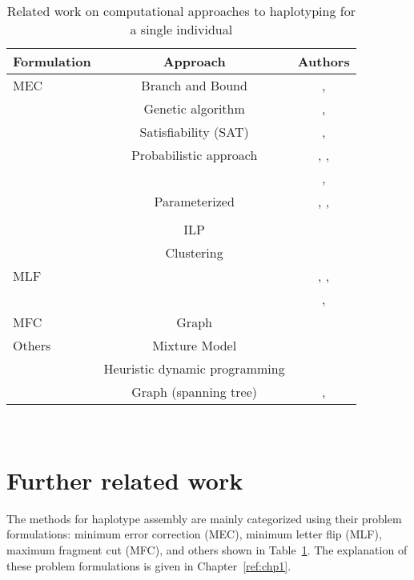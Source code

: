 \begin{center}
\begin{table}
\centering
\begin{tabular}{ |l|c|c| } 
 \hline
Formulation &  Approach  & Authors \\ 
  \hline
 MEC & Branch and Bound & \cite{wang2005haplotype}, \cite{lim2012individual}\\
   & Genetic algorithm& \cite{wang2005haplotype}, \cite{wang2012using}\\
   & Satisfiability (SAT) & \cite{mousavi2011effective}, \cite{he2010optimal} \\
   & Probabilistic approach & \cite{chen2008linear}, \cite{bansal2008mcmc}, \\
   & & \cite{Bansal2008}, \cite{Kuleshov2014b} \\
   & Parameterized & \cite{deng2013highly}, \cite{Pirola2015}, \\
   & & \cite{Patterson2015}\\
   & ILP & \cite{CDW13_exact} \\
   & Clustering & \cite{wang2007clustering} \\
   \hline
   MLF &  & \cite{zhao2005haplotype}, \cite{xie2008model}, \\
   & & \cite{kang2010hapassembler}, \cite{wu2013heuristic}\\
   \hline
   MFC & Graph & \cite{Duitama2010} \\
   \hline
   Others & Mixture Model & \cite{matsumoto2013mixsih} \\
    & Heuristic dynamic programming & \cite{xie2012fast} \\
    & Graph (spanning tree) & \cite{aguiar2012hapcompass}, \cite{mazrouee2014fasthap} \\
 \hline
\end{tabular}
\\[10pt]
 \caption{ Related work on computational approaches to haplotyping for a single individual}
\label{tab:related_work}
\end{table}
\end{center}
\section{Further related work}
The methods for haplotype assembly are mainly categorized using their problem formulations: minimum error correction (MEC), minimum letter flip (MLF), maximum fragment cut (MFC), and others shown in Table~\ref{tab:related_work}.
The explanation of these problem formulations is given in Chapter~\ref{ref:chp1}.

